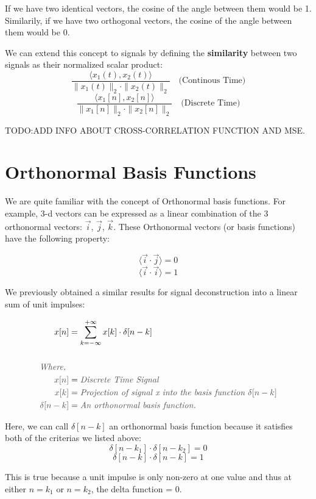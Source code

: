\documentclass[letterpaper,12pt]{article}
\newcommand{\annot}[1]{\textcolor{darkgray}{\textit{#1}}}
\begin{document}
If we have two identical vectors, the cosine of the angle between them would be
1. Similarily, if we have two orthogonal vectors, the cosine of the angle
between them would be 0.

We can extend this concept to signals by defining the \textbf{similarity}
between two signals as their normalized scalar product:
\[\frac{\langle x_1(t), x_2(t) \rangle}{\| x_1(t) \|_2 \cdot \| x_2(t) \|_2}\quad \text{(Continous Time)}\]
\[\frac{\langle x_1[n], x_2[n] \rangle}{\| x_1[n] \|_2 \cdot \| x_2[n] \|_2}\quad \text{(Discrete Time)}\]

TODO:ADD INFO ABOUT CROSS-CORRELATION FUNCTION AND MSE.

\section{Orthonormal Basis Functions}
We are quite familiar with the concept of Orthonormal basis functions. For
example, 3-d vectors can be expressed as a linear combination of the 3
orthonormal vectors: $\Vec{i}$, $\Vec{j}$, $\Vec{k}$. These Orthonormal vectors
(or basis functions) have the following property:

\[\langle \Vec{i} \cdot \Vec{j} \rangle = 0\]
\[\langle \Vec{i} \cdot \Vec{i} \rangle = 1\]

We previously obtained a similar results for signal deconstruction into a
linear sum of unit impulses:

\begin{align*}
    x[n]                  & = \sum_{k=-\infty}^{+\infty} x[k] \cdot \delta [n-k]                   \\ \\
    \annot{Where, }                                                                                \\
    \annot{$x[n]$}        & = \annot{Discrete Time Signal}                                         \\
    \annot{$x[k]$}        & = \annot{Projection of signal x into the basis function $\delta[n-k]$} \\
    \annot{$\delta[n-k]$} & = \annot{An orthonormal basis function.}
\end{align*}

Here, we can call $\delta[n-k]$ an orthonormal basis function because it
satisfies both of the criterias we listed above:
\[\delta[n-k_{1}] \cdot \delta[n-k_{2}] = 0\]
\[\delta[n-k] \cdot \delta[n-k] = 1\]

This is true because a unit impulse is only non-zero at one value and thus at
either $n=k_{1}$ or $n=k_{2}$, the delta function = 0.
\end{document}
